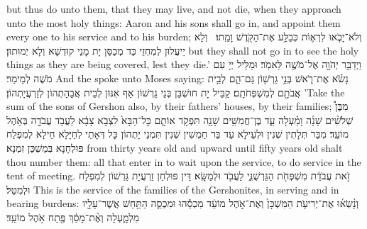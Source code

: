 {but thus do unto them, that they may live, and not die, when they approach unto the most holy things: Aaron and his sons shall go in, and appoint them every one to his service and to his burden;}{}
{וְלֹא־יָבֹ֧אוּ לִרְא֛וֹת כְּבַלַּ֥ע אֶת־הַקֹּ֖דֶשׁ וָמֵֽתוּ׃ \petucha 
{}}
{וְלָא יֵיעֲלוּן לְמִחְזֵי כַּד מְכַסַּן יָת מָנֵי קוּדְשָׁא וְלָא יְמוּתוּן׃}
{but they shall not go in to see the holy things as they are being covered, lest they die.’}{}
{וַיְדַבֵּ֥ר יְהֹוָ֖ה אֶל־מֹשֶׁ֥ה לֵּאמֹֽר׃}
{וּמַלֵּיל יְיָ עִם מֹשֶׁה לְמֵימַר׃}
{And the \lord\space spoke unto Moses saying:}{}
{נָשֹׂ֗א אֶת־רֹ֛אשׁ בְּנֵ֥י גֵרְשׁ֖וֹן גַּם־הֵ֑ם לְבֵ֥ית אֲבֹתָ֖ם לְמִשְׁפְּחֹתָֽם׃
}
{קַבֵּיל יָת חוּשְׁבַּן בְּנֵי גֵרְשׁוֹן אַף אִנּוּן לְבֵית אֲבָהָתְהוֹן לְזַרְעֲיָתְהוֹן׃}
{’Take the sum of the sons of Gershon also, by their fathers’ houses, by their families;}{}
{מִבֶּן֩ שְׁלֹשִׁ֨ים שָׁנָ֜ה וָמַ֗עְלָה עַ֛ד בֶּן־חֲמִשִּׁ֥ים שָׁנָ֖ה תִּפְקֹ֣ד אוֹתָ֑ם כׇּל־הַבָּא֙ לִצְבֹ֣א צָבָ֔א לַעֲבֹ֥ד עֲבֹדָ֖ה בְּאֹ֥הֶל מוֹעֵֽד׃}
{מִבַּר תְּלָתִין שְׁנִין וּלְעֵילָא עַד בַּר חַמְשִׁין שְׁנִין תִּמְנֵי יָתְהוֹן כָּל דְּאָתֵי לְחַיָּלָא חֵילָא לְמִפְלַח פּוּלְחָנָא בְּמַשְׁכַּן זִמְנָא׃}
{from thirty years old and upward until fifty years old shalt thou number them: all that enter in to wait upon the service, to do service in the tent of meeting.}{}
{זֹ֣את עֲבֹדַ֔ת מִשְׁפְּחֹ֖ת הַגֵּרְשֻׁנִּ֑י לַעֲבֹ֖ד וּלְמַשָּֽׂא׃}
{דֵּין פּוּלְחַן זַרְעֲיָת גֵּרְשׁוֹן לְמִפְלַח וּלְמִטַּל׃}
{This is the service of the families of the Gershonites, in serving and in bearing burdens:}{}
{וְנָ֨שְׂא֜וּ אֶת־יְרִיעֹ֤ת הַמִּשְׁכָּן֙ וְאֶת־אֹ֣הֶל מוֹעֵ֔ד מִכְסֵ֕הוּ וּמִכְסֵ֛ה הַתַּ֥חַשׁ אֲשֶׁר־עָלָ֖יו מִלְמָ֑עְלָה וְאֶ֨ת־מָסַ֔ךְ פֶּ֖תַח אֹ֥הֶל מוֹעֵֽד׃
}
